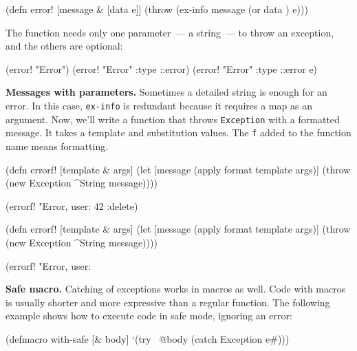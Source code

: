 \else

\begin{clojure}
(defn error! [message & [data e]]
  (throw (ex-info message (or data {}) e)))
\end{clojure}

\fi

\noindent
The function needs only one parameter~--- a string~--- to throw an exception, and the others are optional:

\begin{clojure}
(error! "Error")
(error! "Error" {:type ::error})
(error! "Error" {:type ::error} e)
\end{clojure}

\textbf{ Messages with parameters.} Sometimes a detailed string is enough for an error. In this case, \verb|ex-info| is redundant because it requires a map as an argument. Now, we'll write a function that throws \verb|Exception| with a formatted message. It takes a template and substitution values.
The \verb|f| added to the function name means formatting.


\ifx\DEVICETYPE\MOBILE

\begin{clojure}
(defn errorf! [template & args]
  (let [message (apply format
                  template args)]
    (throw (new Exception
             ^String message))))

(errorf! "Error, user: %
  42 :delete)
\end{clojure}

\else

\begin{clojure}
(defn errorf! [template & args]
  (let [message (apply format template args)]
    (throw (new Exception ^String message))))

(errorf! "Error, user: %
\end{clojure}

\fi

\textbf{Safe macro.} Catching of exceptions works in macros as well. Code with macros is usually shorter and more expressive than a regular function. The following example shows how to execute code in safe mode, ignoring an error:


\begin{clojure}
(defmacro with-safe [& body]
  `(try
     ~@body
     (catch Exception e#)))
\end{clojure}


